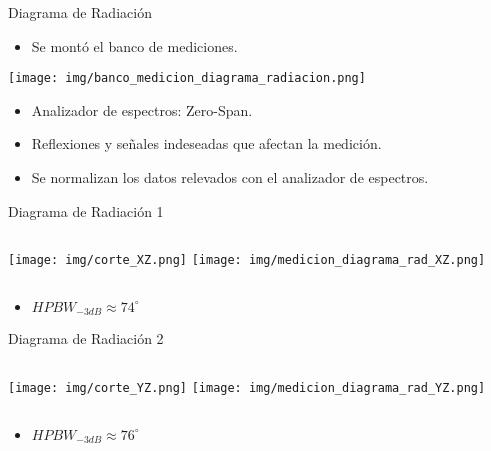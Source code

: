 \begin{frame}{Diagrama de Radiación}

\begin{itemize}
    \item<1-> Se montó el banco de mediciones.
\end{itemize}

\begin{center}
    \texttt{[image: img/banco\_medicion\_diagrama\_radiacion.png]}
\end{center}

\begin{itemize}
    \item<3-> Analizador de espectros: Zero-Span.
    \item<4-> Reflexiones y señales indeseadas que afectan la medición.
    \item<5-> Se normalizan los datos relevados con el analizador de espectros.
\end{itemize}

\end{frame}

\begin{frame}{Diagrama de Radiación 1}
    \begin{columns}
            \texttt{[image: img/corte\_XZ.png]}
            \texttt{[image: img/medicion\_diagrama\_rad\_XZ.png]}
    \end{columns}
    \begin{itemize}
        \item $HPBW_{-3dB} \approx 74^{\circ}$
    \end{itemize}
\end{frame}

\begin{frame}{Diagrama de Radiación 2}
    \begin{columns}
            \texttt{[image: img/corte\_YZ.png]}
            \texttt{[image: img/medicion\_diagrama\_rad\_YZ.png]}
    \end{columns}
    \begin{itemize}
        \item $HPBW_{-3dB} \approx 76^{\circ}$
    \end{itemize}
\end{frame}


